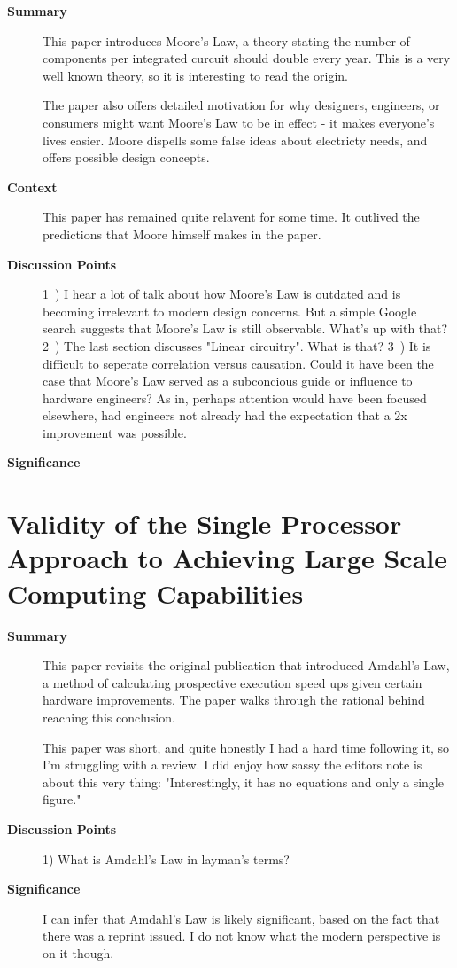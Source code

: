 \begin{description}
    \item[\textbf{Summary}]
    This paper introduces Moore's Law, a theory stating the number of components
    per integrated curcuit should double every year. This is a very well known
    theory, so it is interesting to read the origin.

    The paper also offers detailed motivation for why designers, engineers, or
    consumers might want Moore's Law to be in effect - it makes everyone's lives
    easier. Moore dispells some false ideas about electricty needs, and offers
    possible design concepts.
    \item[\textbf{Context}]
    This paper has remained quite relavent for some time. It outlived the
    predictions that Moore himself makes in the paper.
    \item[\textbf{Discussion Points}]
    1~) I hear a lot of talk about how Moore's Law is outdated and is becoming
    irrelevant to modern design concerns. But a simple Google search suggests
    that Moore's Law is still observable. What's up with that?
    2~) The last section discusses "Linear circuitry". What is that?
    3~) It is difficult to seperate correlation versus causation. Could it have
    been the case that Moore's Law served as a subconcious guide or influence to
    hardware engineers? As in, perhaps attention would have been focused
    elsewhere, had engineers not already had the expectation that a 2x
    improvement was possible.
    \item[\textbf{Significance}]
\end{description}

\section {Validity of the Single Processor Approach to Achieving Large Scale
Computing Capabilities \cite{amdahl1967validity}}

\begin{description}
    \item[\textbf{Summary}]
    This paper revisits the original publication that introduced Amdahl's Law,
    a method of calculating prospective execution speed ups given certain
    hardware improvements. The paper walks through the rational behind reaching
    this conclusion.

    This paper was short, and quite honestly I had a hard time following it, so
    I'm struggling with a review. I did enjoy how sassy the editors note is
    about this very thing: "Interestingly, it has no equations and only a single
    figure."
    \item[\textbf{Discussion Points}]
    1) What is Amdahl's Law in layman's terms?
    \item[\textbf{Significance}]
    I can infer that Amdahl's Law is likely significant, based on the fact that
    there was a reprint issued. I do not know what the modern perspective is on
    it though.
\end{description}

